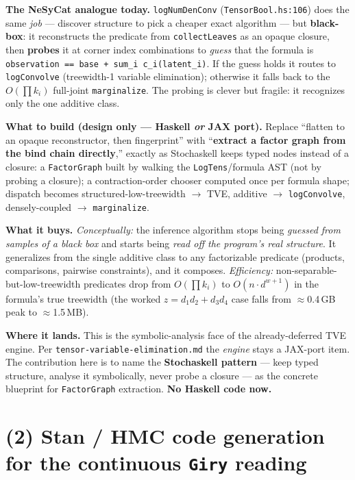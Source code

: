 \documentclass[11pt]{article}
\newcommand{\code}[1]{\texttt{#1}}
\begin{document}
\textbf{The NeSyCat analogue today.} \code{logNumDenConv} (\code{TensorBool.hs:106}) does the same
\emph{job} --- discover structure to pick a cheaper exact algorithm --- but \textbf{black-box}: it
reconstructs the predicate from \code{collectLeaves} as an opaque closure, then \textbf{probes} it at
corner index combinations to \emph{guess} that the formula is
\code{observation == base + sum\_i c\_i(latent\_i)}. If the guess holds it routes to \code{logConvolve}
(treewidth-1 variable elimination); otherwise it falls back to the $O(\prod k_i)$ full-joint
\code{marginalize}. The probing is clever but fragile: it recognizes only the one additive class.

\textbf{What to build (design only --- Haskell \emph{or} JAX port).} Replace ``flatten to an opaque
reconstructor, then fingerprint'' with ``\textbf{extract a factor graph from the bind chain directly},''
exactly as Stochaskell keeps typed nodes instead of a closure: a \code{FactorGraph} built by walking the
\code{LogTens}/formula AST (not by probing a closure); a contraction-order chooser computed once per
formula shape; dispatch becomes structured-low-treewidth $\to$ TVE, additive $\to$ \code{logConvolve},
densely-coupled $\to$ \code{marginalize}.

\textbf{What it buys.} \emph{Conceptually:} the inference algorithm stops being \emph{guessed from
samples of a black box} and starts being \emph{read off the program's real structure}. It generalizes
from the single additive class to any factorizable predicate (products, comparisons, pairwise
constraints), and it composes. \emph{Efficiency:} non-separable-but-low-treewidth predicates drop from
$O(\prod k_i)$ to $O(n \cdot d^{w+1})$ in the formula's true treewidth (the worked
$z = d_1 d_2 + d_3 d_4$ case falls from $\approx$0.4\,GB peak to $\approx$1.5\,MB).

\textbf{Where it lands.} This is the symbolic-analysis face of the already-deferred TVE engine. Per
\code{tensor-variable-elimination.md} the \emph{engine} stays a JAX-port item. The contribution here is
to name the \textbf{Stochaskell pattern} --- keep typed structure, analyse it symbolically, never probe
a closure --- as the concrete blueprint for \code{FactorGraph} extraction. \textbf{No Haskell code now.}

\section*{(2) Stan / HMC code generation for the continuous \texttt{Giry} reading}
\end{document}

